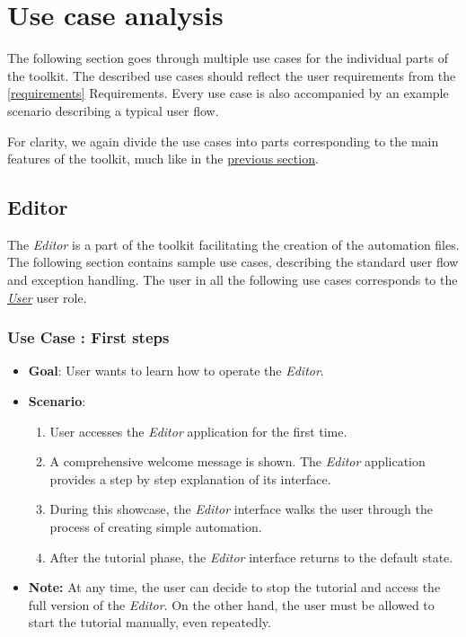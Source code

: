 \section{Use case analysis}

The following section goes through multiple use cases for the individual parts of the toolkit.
The described use cases should reflect the user requirements from the \autoref{requirements} Requirements.
Every use case is also accompanied by an example scenario describing a typical user flow.

For clarity, we again divide the use cases into parts corresponding to the main features of the toolkit, 
much like in the \hyperref[requirements]{previous section}.

\subsection{Editor}

The \textit{Editor} is a part of the toolkit facilitating the creation of the automation files.
The following section contains sample use cases, describing the standard user flow and exception handling.
The user in all the following use cases corresponds to the \hyperref[UserUserRole]{\textit{User}} user role.

\setcounter{usecases}{1}

\def \usecase {Use Case }

\subsubsection*{\usecase: First steps}
\begin{itemize}
    \item \textbf{Goal}: User wants to learn how to operate the \textit{Editor}.
    \item \textbf{Scenario}: 
    \begin{enumerate}[label=\arabic*.]
        \item User accesses the \textit{Editor} application for the first time. 
        \item A comprehensive welcome message is shown.
        The \textit{Editor} application provides a step by step explanation of its interface.
        \item During this showcase, the \textit{Editor} interface walks the user through the process of creating simple automation.
        \item After the tutorial phase, the \textit{Editor} interface returns to the default state.
    \end{enumerate}
    \item \textbf{Note:} At any time, the user can decide to stop the tutorial and access the full version of the \textit{Editor}.
    On the other hand, the user must be allowed to start the tutorial manually, even repeatedly.
\end{itemize}

